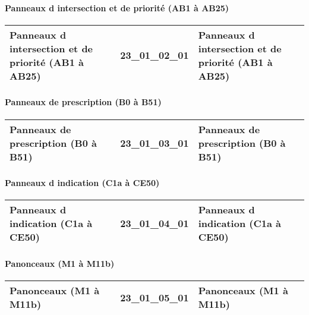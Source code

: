 \documentclass[12pt,titlepage]{book}
\begin{document}
\paragraph{Panneaux d intersection et de priorité (AB1 à AB25)}
\noindent
\vspace{\baselineskip}

\renewcommand{\arraystretch}{1.2}
\begin{supertabular}{|p{10cm}|c|p{15cm}|}
 Panneaux d intersection et de priorité (AB1 à AB25) & 23\_01\_02\_01 & Panneaux d intersection et de priorité (AB1 à AB25)\\
\hline
\end{supertabular}


\paragraph{Panneaux de prescription (B0 à B51)}
\noindent
\vspace{\baselineskip}

\renewcommand{\arraystretch}{1.2}
\begin{supertabular}{|p{10cm}|c|p{15cm}|}
 Panneaux de prescription (B0 à B51) & 23\_01\_03\_01 & Panneaux de prescription (B0 à B51)\\
\hline
\end{supertabular}


\paragraph{Panneaux d indication (C1a à CE50)}
\noindent
\vspace{\baselineskip}

\renewcommand{\arraystretch}{1.2}
\begin{supertabular}{|p{10cm}|c|p{15cm}|}
 Panneaux d indication (C1a à CE50) & 23\_01\_04\_01 & Panneaux d indication (C1a à CE50)\\
\hline
\end{supertabular}


\paragraph{Panonceaux (M1 à M11b)}
\noindent
\vspace{\baselineskip}

\renewcommand{\arraystretch}{1.2}
\begin{supertabular}{|p{10cm}|c|p{15cm}|}
 Panonceaux (M1 à M11b) & 23\_01\_05\_01 & Panonceaux (M1 à M11b)\\
\hline
\end{supertabular}
\end{document}

